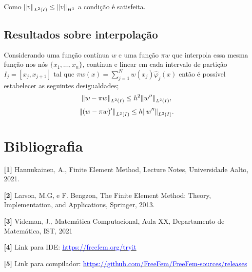 \documentclass{article}
\theoremstyle{definition}
\theoremstyle{plain}
\numberwithin{equation}{section}
\newcommand{\tab}{\hspace{10mm}}
\begin{document}
Como $\norm{v}_{L^2(I)} \leq \norm{v}_{H^1}$ a condição é satisfeita.

\subsection{Resultados sobre interpolação}
\label{sec:7.5}
\tab Considerando uma função contínua $w$ e uma função $\pi w$ que interpola essa mesma função nos nós $\{x_1,...,x_n\}$, contínua e linear em cada intervalo de partição $I_j=[x_j,x_{j+1}]$ tal que $\pi w(x)=\sum^N_{j=1}w(x_j)\hat{\varphi}_j(x)$ então é possível estabelecer as seguintes desigualdades;
\begin{equation*}
    \norm{w-\pi w}_{L^2(I)} \leq h^2\norm{w''}_{L^2(I)},
\end{equation*}
\begin{equation*}
    \norm{(w-\pi w)'}_{L^2(I)} \leq h\norm{w''}_{L^2(I)}.
\end{equation*}

\vspace{3mm}

\section{Bibliografia}
\textbf{[1]}  Hannukainen, A., Finite Element Method, Lecture Notes,
Universidade Aalto, 2021.

\vspace{1mm}
\textbf{[2]}  Larson, M.G, e F. Bengzon, The Finite Element Method: Theory,
Implementation, and Applications, Springer, 2013.

\vspace{1mm}

\vspace{1mm}
\textbf{[3]}  Videman, J., Matemática Computacional, Aula XX, Departamento de Matemática, IST, 2021

\vspace{1mm}

\textbf{[4]} Link para IDE:  \href{https://freefem.org/tryit}{\textcolor{blue}{https://freefem.org/tryit}}

\vspace{1mm}
\textbf{[5]} Link para compilador:
\href{https://github.com/FreeFem/FreeFem-sources/releases}{\textcolor{blue}{https://github.com/FreeFem/FreeFem-sources/releases}}
\end{document}
